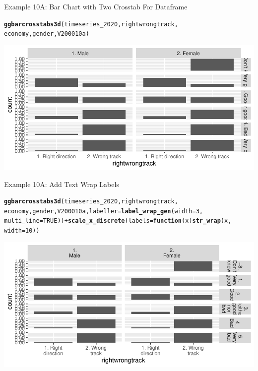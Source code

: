 \documentclass{beamer}\usepackage[]{graphicx}\usepackage[]{color}
\makeatletter
\newcommand{\hlnum}[1]{\textcolor[rgb]{0.686,0.059,0.569}{#1}}%
\newcommand{\hlopt}[1]{\textcolor[rgb]{0,0,0}{#1}}%
\newcommand{\hlstd}[1]{\textcolor[rgb]{0.345,0.345,0.345}{#1}}%
\newcommand{\hlkwa}[1]{\textcolor[rgb]{0.161,0.373,0.58}{\textbf{#1}}}%
\newcommand{\hlkwc}[1]{\textcolor[rgb]{0.333,0.667,0.333}{#1}}%
\newcommand{\hlkwd}[1]{\textcolor[rgb]{0.737,0.353,0.396}{\textbf{#1}}}%
\newenvironment{kframe}{%
 \def\at@end@of@kframe{}%
 \ifinner\ifhmode%
  \def\at@end@of@kframe{\end{minipage}}%
  \begin{minipage}{\columnwidth}%
 \fi\fi%
 \def\FrameCommand##1{\hskip\@totalleftmargin \hskip-\fboxsep
 \colorbox{shadecolor}{##1}\hskip-\fboxsep
     \hskip-\linewidth \hskip-\@totalleftmargin \hskip\columnwidth}%
 \MakeFramed {\advance\hsize-\width
   \@totalleftmargin\z@ \linewidth\hsize
   \@setminipage}}%
 {\par\unskip\endMakeFramed%
 \at@end@of@kframe}
\newenvironment{knitrout}{}{} %
\makeatother
\begin{document}
\begin{frame}[fragile]{Example 10A: Bar Chart with Two Crosstab For Dataframe}

\begin{knitrout}
\color{fgcolor}\begin{kframe}
\begin{alltt}
\hlkwd{ggbarcrosstabs3d}\hlstd{(timeseries_2020, rightwrongtrack,}
    \hlstd{economy, gender, V200010a)}
\end{alltt}
\end{kframe}
\includegraphics[width=0.95\linewidth]{figure/unnamed-chunk-40-1} 
\end{knitrout}
\end{frame}

\begin{frame}[fragile]{Example 10A: Add Text Wrap Labels}

\begin{knitrout}
\color{fgcolor}\begin{kframe}
\begin{alltt}
\hlkwd{ggbarcrosstabs3d}\hlstd{(timeseries_2020, rightwrongtrack,}
    \hlstd{economy, gender, V200010a,} \hlkwc{labeller} \hlstd{=} \hlkwd{label_wrap_gen}\hlstd{(}\hlkwc{width} \hlstd{=} \hlnum{3}\hlstd{,}
        \hlkwc{multi_line} \hlstd{=} \hlnum{TRUE}\hlstd{))} \hlopt{+} \hlkwd{scale_x_discrete}\hlstd{(}\hlkwc{labels} \hlstd{=} \hlkwa{function}\hlstd{(}\hlkwc{x}\hlstd{)} \hlkwd{str_wrap}\hlstd{(x,}
    \hlkwc{width} \hlstd{=} \hlnum{10}\hlstd{))}
\end{alltt}
\end{kframe}
\includegraphics[width=0.95\linewidth]{figure/unnamed-chunk-41-1} 
\end{knitrout}
\end{frame}
\end{document}
